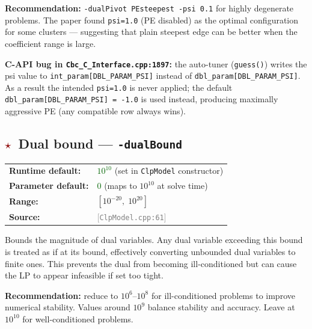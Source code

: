 \documentclass[11pt,a4paper]{article}
\newcommand{\param}[1]{\texttt{\textbf{#1}}}
\newcommand{\val}[1]{\texttt{#1}}
\newcommand{\src}[1]{\textcolor{gray}{\small[\texttt{#1}]}}
\newcommand{\default}[1]{\textcolor{darkgreen}{\texttt{#1}}}
\newcommand{\important}{\textcolor{darkred}{\textbf{$\star$}}}
\begin{document}
\begin{tipbox}
  \textbf{Recommendation:} \val{-dualPivot PEsteepest -psi 0.1} for highly
  degenerate problems. The paper found \val{psi=1.0} (PE disabled) as the optimal
  configuration for some clusters --- suggesting that plain steepest edge can
  be better when the coefficient range is large.
\end{tipbox}

\begin{warnbox}
  \textbf{C-API bug in \texttt{Cbc\_C\_Interface.cpp:1897}:} the auto-tuner
  (\texttt{guess()}) writes the psi value to \texttt{int\_param[DBL\_PARAM\_PSI]}
  instead of \texttt{dbl\_param[DBL\_PARAM\_PSI]}. As a result the intended
  \texttt{psi=1.0} is never applied; the default \texttt{dbl\_param[DBL\_PARAM\_PSI] = -1.0}
  is used instead, producing maximally aggressive PE (any compatible row always wins).
\end{warnbox}

\subsection{\important\ Dual bound --- \param{-dualBound}}

\begin{tabular}{@{}ll@{}}
  \textbf{Runtime default:} & \default{$10^{10}$} (set in \texttt{ClpModel} constructor) \\
  \textbf{Parameter default:} & \default{$0$} (maps to $10^{10}$ at solve time) \\
  \textbf{Range:}  & $[10^{-20},\; 10^{20}]$ \\
  \textbf{Source:} & \src{ClpModel.cpp:61}
\end{tabular}

\medskip
Bounds the magnitude of dual variables. Any dual variable exceeding this bound is
treated as if at its bound, effectively converting unbounded dual variables to
finite ones. This prevents the dual from becoming ill-conditioned but can cause
the LP to appear infeasible if set too tight.

\begin{tipbox}
  \textbf{Recommendation:} reduce to $10^{6}$--$10^{8}$ for ill-conditioned problems
  to improve numerical stability. Values around $10^{9}$ balance stability and
  accuracy. Leave at $10^{10}$ for well-conditioned problems.
\end{tipbox}

\end{document}
